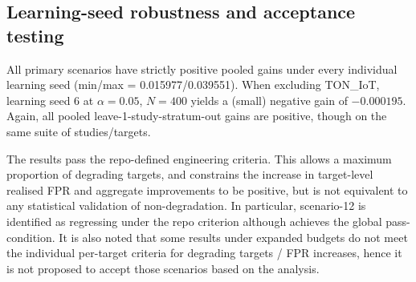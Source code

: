 \subsection{Learning-seed robustness and acceptance testing} 
All primary scenarios have strictly positive pooled gains under every individual learning seed (min/max = 0.015977/0.039551). When excluding TON\_IoT, learning seed 6 at $\alpha=0.05$, $N=400$ yields a (small) negative gain of $-0.000195$. Again, all pooled leave-1-study-stratum-out gains are positive, though on the same suite of studies/targets.

The results pass the repo-defined engineering criteria. This allows a maximum proportion of degrading targets, and constrains the increase in target-level realised FPR and aggregate improvements to be positive, but is not equivalent to any statistical validation of non-degradation. In particular, scenario-12 is identified as regressing under the repo criterion although achieves the global pass-condition. It is also noted that some results under expanded budgets do not meet the individual per-target criteria for degrading targets / FPR increases, hence it is not proposed to accept those scenarios based on the analysis.

